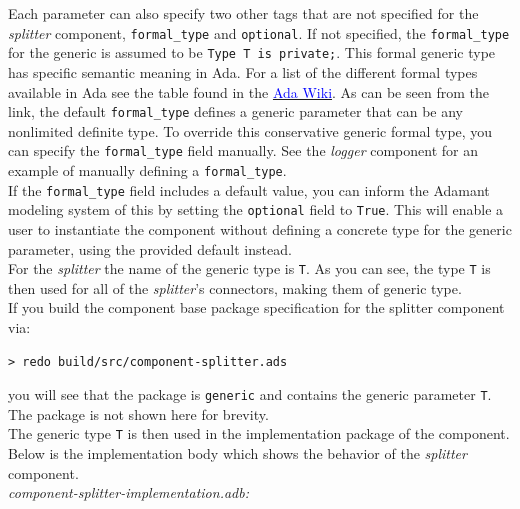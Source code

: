 Each parameter can also specify two other tags that are not specified for the \textit{splitter} component, \texttt{formal\_type} and \texttt{optional}. If not specified, the \texttt{formal\_type} for the generic is assumed to be \texttt{Type T is private;}. This formal generic type has specific semantic meaning in Ada. For a list of the different formal types available in Ada see the table found in the \href{https://en.wikibooks.org/wiki/Ada_Programming/Generics#Generic_Formal_Types}{\textcolor{blue}{Ada Wiki}}. As can be seen from the link, the default \texttt{formal\_type} defines a generic parameter that can be any nonlimited definite type. To override this conservative generic formal type, you can specify the \texttt{formal\_type} field manually. See the \textit{logger} component for an example of manually defining a \texttt{formal\_type}. \\

If the \texttt{formal\_type} field includes a default value, you can inform the Adamant modeling system of this by setting the \texttt{optional} field to \texttt{True}. This will enable a user to instantiate the component without defining a concrete type for the generic parameter, using the provided default instead. \\

For the \textit{splitter} the name of the generic type is \texttt{T}. As you can see, the type \texttt{T} is then used for all of the \textit{splitter}'s connectors, making them of generic type. \\

If you build the component base package specification for the splitter component via:

\vspace{5mm} %
\begin{verbatim}
> redo build/src/component-splitter.ads
\end{verbatim}
\vspace{5mm} %

you will see that the package is \texttt{generic} and contains the generic parameter \texttt{T}. The package is not shown here for brevity. \\

The generic type \texttt{T} is then used in the implementation package of the component. Below is the implementation body which shows the behavior of the \textit{splitter} component. \\

\textit{component-splitter-implementation.adb:} 

